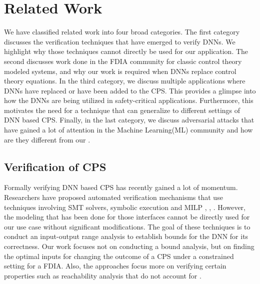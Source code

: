 \chapter{Related Work}
\label{relatedwork}

We have classified related work into four broad categories. 
The first category discusses the verification techniques that have emerged to verify DNNs. We highlight why those techniques cannot directly be used for our application. The second discusses work done in the \ac{FDIA} community for classic control theory modeled systems, and why our work is required when \ac{DNN}s replace control theory equations. 
In the third category, we discuss multiple applications where DNNs have replaced or have been added to the CPS. This provides a glimpse into how the DNNs are being utilized in safety-critical applications. Furthermore, this motivates the need for a technique that can generalize to different settings of DNN based CPS.
 Finally, in the last category, we discuss adversarial attacks that have gained a lot of attention in the Machine Learning(ML) community and how are they different from our \attack. 
\section{Verification of CPS}

Formally verifying DNN based CPS has recently gained a lot of momentum. Researchers have proposed automated verification mechanisms that use techniques involving SMT solvers, symbolic execution and MILP \cite{10.1007/978-3-642-14295-6_24}, \cite{article}, \cite{10.1007/978-3-319-63387-9_5}. 
However, the modeling that has been done for those interfaces cannot be directly used for our use case without significant modifications. 
The goal of these techniques is to conduct an input-output range analysis to establish bounds for the DNN for its correctness. Our work focuses not on conducting a bound analysis, but on finding the optimal inputs for changing the outcome of a CPS under a constrained setting for a FDIA. Also, the approaches focus more on verifying certain properties such as reachability analysis that do not account for \attack.

